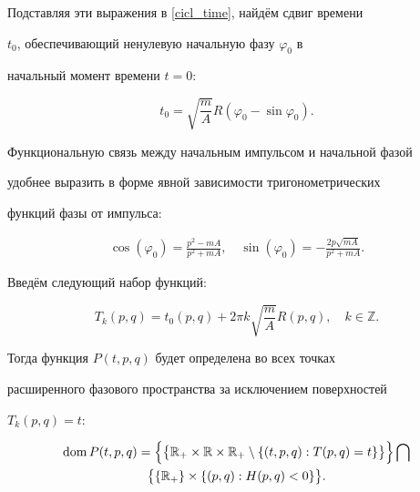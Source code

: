 Подставляя эти выражения в \eqref{cicl_time}, найдём  сдвиг времени

$t_0$, обеспечивающий  ненулевую начальную фазу $\varphi_0$  в

начальный момент времени $t=0$:

$$

t_0=\sqrt{\frac{m}{A}}R(\varphi_0-\sin\varphi_0).

$$

Функциональную связь между начальным импульсом и начальной фазой

удобнее выразить в форме явной зависимости тригонометрических

функций фазы от импульса:

\begin{gather}

\cos(\varphi_0)=\frac{p^2 -mA}{p^2+ mA},

\quad 

\sin(\varphi_0)=-\frac{2p\sqrt{mA}}{p^2+ mA}.

\end{gather}



Введём следующий набор функций:

$$

T_k(p,q)= t_0(p, q)+2 \pi k\sqrt{\frac{m}{A}}R(p, q), \quad  k \in

\mathbb{Z}.

$$







\noindent

Тогда  функция $P(t,p,q)$ будет определена  во всех точках

расширенного фазового пространства за исключением поверхностей

$T_k(p,q)= t$:

\begin{multline*}

\mathop{\rm dom} P(t,p,q) =

\Bigl\{ \bigl\{ \mathbb{R}_{+}\times \mathbb{R}\times

\mathbb{R}_{+} \setminus \{(t,p,q): T(p,q)= t \} \bigr\} \Bigr\}\bigcap \\

 \bigl\{\{

\mathbb{R}_{+}\}\times\{(p,q): H(p,q)<0 \} \bigr\}.

\end{multline*}

